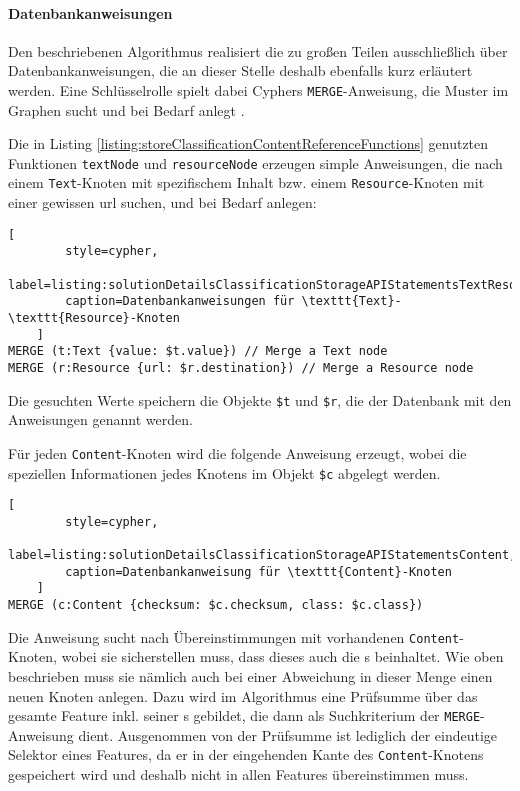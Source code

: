     \paragraph{Datenbankanweisungen}
    Den beschriebenen Algorithmus realisiert die {\classificationStorageAPI}
    zu großen Teilen ausschließlich über Datenbankanweisungen,
    die an dieser Stelle deshalb ebenfalls kurz erläutert werden.
    Eine Schlüsselrolle spielt dabei Cyphers \texttt{MERGE}-Anweisung,
    die Muster im Graphen sucht und bei Bedarf anlegt
    \cite[Kapitel 3.3.16]{neo4j:documentation}.

    Die in Listing \ref{listing:storeClassificationContentReferenceFunctions} genutzten
    Funktionen \texttt{textNode} und \texttt{resourceNode} erzeugen simple Anweisungen,
    die nach einem \texttt{Text}-Knoten mit spezifischem Inhalt bzw.
    einem \texttt{Resource}-Knoten mit einer gewissen \gls{url} suchen,
    und bei Bedarf anlegen:

    \begin{lstlisting}[
        style=cypher,
        label=listing:solutionDetailsClassificationStorageAPIStatementsTextResource,
        caption=Datenbankanweisungen für \texttt{Text}- \texttt{Resource}-Knoten
    ]
MERGE (t:Text {value: $t.value}) // Merge a Text node
MERGE (r:Resource {url: $r.destination}) // Merge a Resource node
    \end{lstlisting}
    
    Die gesuchten Werte speichern die Objekte \verb+$t+ und \verb+$r+,
    die der Datenbank mit den Anweisungen genannt werden.

    Für jeden \texttt{Content}-Knoten wird die folgende Anweisung erzeugt,
    wobei die speziellen Informationen jedes Knotens im Objekt \verb+$c+
    abgelegt werden.

    \begin{lstlisting}[
        style=cypher,
        label=listing:solutionDetailsClassificationStorageAPIStatementsContent,
        caption=Datenbankanweisung für \texttt{Content}-Knoten
    ]
MERGE (c:Content {checksum: $c.checksum, class: $c.class})
    \end{lstlisting}

    Die Anweisung sucht nach Übereinstimmungen mit vorhandenen \texttt{Content}-Knoten,
    wobei sie sicherstellen muss, dass dieses auch die {\childFeature}s beinhaltet.
    Wie oben beschrieben muss sie nämlich auch bei einer Abweichung in dieser Menge einen neuen Knoten anlegen.
    Dazu wird im Algorithmus  eine Prüfsumme über das gesamte Feature inkl. seiner {\childFeature}s gebildet,
    die dann als Suchkriterium der \texttt{MERGE}-Anweisung dient.
    Ausgenommen von der Prüfsumme ist lediglich der eindeutige Selektor eines Features,
    da er in der eingehenden Kante des \texttt{Content}-Knotens gespeichert wird
    und deshalb nicht in allen Features übereinstimmen muss.

